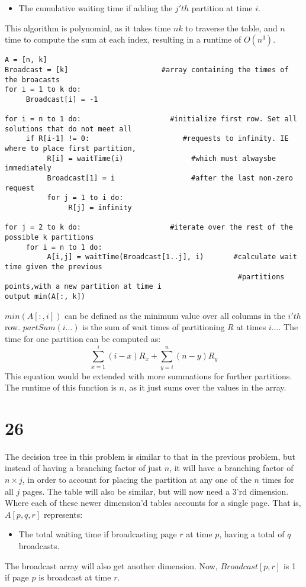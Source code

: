 \documentclass[letterpaper,notitlepage,twoside]{article}
\begin{document}
\begin{itemize}
\item The cumulative waiting time if adding the $j'th$ partition at time $i$. 
\end{itemize}
This algorithm is polynomial, as it takes time $nk$ to traverse the table, and $n$ time to compute the sum at each index, resulting in a runtime of $O(n^3)$. 
\begin{verbatim}
A = [n, k] 
Broadcast = [k]                      #array containing the times of the broacasts
for i = 1 to k do:
     Broadcast[i] = -1

for i = n to 1 do:                     #initialize first row. Set all solutions that do not meet all 
     if R[i-1] != 0:                      #requests to infinity. IE where to place first partition, 
          R[i] = waitTime(i)                #which must alwaysbe immediately 
          Broadcast[1] = i                  #after the last non-zero request
          for j = 1 to i do:
               R[j] = infinity         
               
for j = 2 to k do:                     #iterate over the rest of the possible k partitions 
     for i = n to 1 do:
          A[i,j] = waitTime(Broadcast[1..j], i)       #calculate wait time given the previous 
                                                       #partitions points,with a new partition at time i
output min(A[:, k])
\end{verbatim}
$min(A[:, i])$ can be defined as the minimum value over all columns in the $i'th$ row. $partSum(i...)$ is the sum of wait times of partitioning $R$ at times $i...$. The time for one partition can be computed as:
$$\sum_{x=1}^{i} (i-x)R_x + \sum_{y=i}^{n} (n-y)R_y $$
This equation would be extended with more summations for further partitions. The runtime of this function is $n$, as it just sums over the values in the array. 
\section*{26}
The decision tree in this problem is similar to that in the previous problem, but instead of having a branching factor of just $n$, it will have a branching factor of $n\times j$, in order to account for placing the partition at any one of the $n$ times for all $j$ pages. The table will also be similar, but will now need a 3'rd dimension. Where each of these newer dimension'd tables accounts for a single page. That is, $A[p, q, r]$ represents:
\begin{itemize}
\item The total waiting time if broadcasting page $r$ at time $p$, having a total of $q$ broadcasts. 
\end{itemize}
The broadcast array will also get another dimension. Now, $Broadcast[p, r]$ is 1 if page $p$ is broadcast at time $r$.   
\end{document}
